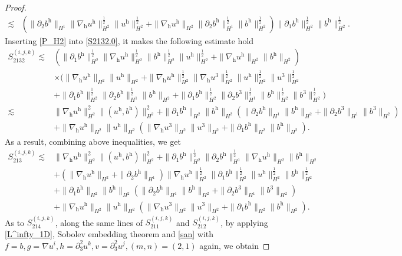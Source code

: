 \documentclass[10pt,a4paper]{amsart}
\newcommand{\h}{\mathrm{h}}
\newcommand{\nablah}{\nabla_{\mathrm{h}}}
\begin{document}
\begin{proof}
\begin{align}
		\lesssim&\left(\|\partial_2b^\h\|_{H^1}\|\nablah u^\h\|_{H^2}^\frac12\| u^\h\|_{H^2}^\frac12+\|\nablah u^\h\|_{H^2}\|\partial_2b^\h\|_{H^1}^\frac12\|b^\h\|_{H^2}^\frac12 \right) \|\partial_1b^\h\|_{H^2}^\frac12\| b^\h\|_{H^2}^\frac12.\nonumber
	\end{align}
	Inserting \eqref{P_H2} into \eqref{S2132.0}, it makes the following estimate hold
	\begin{align*}
		S^{(i,j,k)}_{2132}
		\lesssim&\left(\|\partial_1b^\h\|_{H^2}^\frac12\|\nablah u^\h\|_{H^2}^\frac12\| b^\h\|_{H^2}^\frac12\| u^\h\|_{H^2}^\frac12+\|\nablah u^\h\|_{H^2}\|b^\h\|_{H^2}\right)\nonumber\\
		&\times\bigg(\|\nablah u^\h\|_{H^2}\|u^\h\|_{H^2}+ \|\nablah u^\h\|_{H^2}^\frac12\|\nablah u^3\|_{H^2}^\frac12\|u^\h\|_{H^2}^\frac12\|u^3\|_{H^2}^\frac12 \nonumber\\
		&+\|\partial_1b^\h\|_{H^2}^\frac12\|\partial_2b^\h\|_{H^1}^\frac12\|b^\h\|_{H^2}+\|\partial_1b^\h\|_{H^2}^\frac12\|\partial_2b^3\|_{H^1}^\frac12\|b^\h\|_{H^2}^\frac12\|b^3\|_{H^2}^\frac12\bigg)\nonumber\\
		\lesssim&\|\nablah u^\h\|_{H^2}^2\|(u^\h,b^\h)\|_{H^2}^2+\|\partial_1b^\h\|_{H^2}\|b^\h\|_{H^2}\left(\|\partial_2b^\h\|_{H^1}\|b^\h\|_{H^2}+\|\partial_2b^3\|_{H^1}\|b^3\|_{H^2}\right)\nonumber\\
		&+ \|\nablah u^\h\|_{H^2}\|u^\h\|_{H^2}\left(\|\nablah u^3\|_{H^2}\|u^3\|_{H^2}+\|\partial_1b^\h\|_{H^2}\| b^\h\|_{H^2}\right).
	\end{align*}
	As a result, combining above inequalities, we get
	\begin{align}\label{S213}
		S^{(i,j,k)}_{213}\lesssim&\|\nablah u^\h\|_{H^2}^2\|(u^\h,b^\h)\|_{H^2}^2+\|\partial_1b^\h\|_{H^2}^\frac12\|\partial_2b^\h\|_{H^1}^\frac12\|\nablah u^\h\|_{H^2}\|b^\h\|_{H^2}\nonumber\\
		&+\left(\|\nablah u^\h\|_{H^2}+\|\partial_2b^\h\|_{H^1}\right)\|\nablah u^\h\|_{H^2}^\frac12\|\partial_1b^\h\|_{H^2}^\frac12\| u^\h\|_{H^2}^\frac12  \| b^\h\|_{H^2}^\frac12\nonumber\\
		&+\|\partial_1b^\h\|_{H^2}\|b^\h\|_{H^2}\left(\|\partial_2b^\h\|_{H^1}\|b^\h\|_{H^2}+\|\partial_2b^3\|_{H^1}\|b^3\|_{H^2}\right)\nonumber\\
		&+ \|\nablah u^\h\|_{H^2}\|u^\h\|_{H^2}\left(\|\nablah u^3\|_{H^2}\|u^3\|_{H^2}+\|\partial_1b^\h\|_{H^2}\| b^\h\|_{H^2}\right).
	\end{align}
	As to  $S^{(i,j,k)}_{214}$,  along the same lines of  $S^{(i,j,k)}_{211}$ and $S^{(i,j,k)}_{212}$, by applying \eqref{L^infty_1D}, Sobolev embedding theorem and \eqref{san} with $f=b,g=\nabla u^i,h=\partial_3^2u^k,v=\partial_3^2u^j,(m,n)=(2,1)$ again, we obtain

\end{proof}
\end{document}
